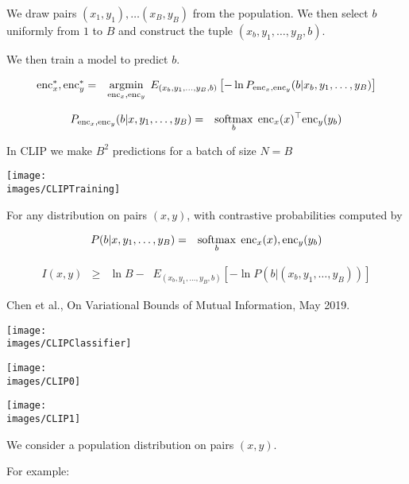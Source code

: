 {We draw pairs $(x_1,y_1), \ldots (x_B,y_B)$ from the population.
We then select $b$ uniformly from $1$ to $B$ and construct the tuple $(x_b,y_1,\ldots,y_B,b)$.

\vfill
We then train a model to predict $b$.
\vfill
{\huge
\begin{eqnarray*}
\mathrm{enc}_x^*,\mathrm{enc}_y^* & = & \operatorname*{argmin}_{\mathrm{enc}_x,\mathrm{enc}_y} \;E_{(x_b,y_1,\ldots,y_B,b)}\left[-\ln P_{\mathrm{enc}_x,\mathrm{enc}_y}(b|x_b,y_1,\ldots,y_B)\right]
\end{eqnarray*}

\begin{eqnarray*}
P_{\mathrm{enc}_x,\mathrm{enc}_y}(b|x,y_1,\ldots,y_B) & = & \operatorname*{softmax}_b\; \mathrm{enc}_x(x)^\top\mathrm{enc}_y(y_b)
\end{eqnarray*}
}


In CLIP we make $B^2$ predictions for a batch of size $N = B$
\centerline{\texttt{[image: \\images/CLIPTraining]}}



For any distribution on pairs $(x,y)$, with contrastive probabilities computed by

\begin{eqnarray*}
P(b|x,y_1,\ldots,y_B) & = & \operatorname*{softmax}_b\;\mathrm{enc}_x(x),\mathrm{enc}_y(y_b)
\end{eqnarray*}

{\huge
\begin{eqnarray*}
I(x,y) & \geq & \ln B - \;\;E_{(x_b,y_1,\ldots,y_B,b)}\left[-\ln P(b|(x_b,y_1,\ldots,y_B))\right]
\end{eqnarray*}
}

Chen et al., On Variational Bounds of Mutual Information, May 2019.


\centerline{\texttt{[image: \\images/CLIPClassifier]}}


\centerline{\texttt{[image: \\images/CLIP0]}}


\centerline{\texttt{[image: \\images/CLIP1]}}


 We consider a population distribution on pairs $(x,y)$.
 
 \vfill
 For example:
 
}
